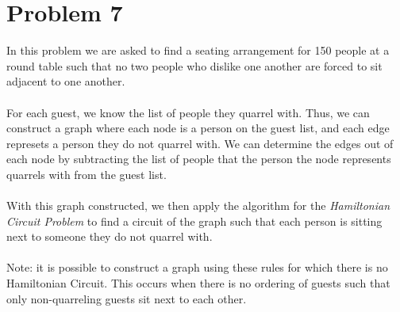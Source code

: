 \section*{Problem 7}

In this problem we are asked to find a seating arrangement for 150 people at a 
round table such that no two people who dislike one another are forced to sit
adjacent to one another.
\\
\\
For each guest, we know the list of people they quarrel with. Thus, we can 
construct a graph where each node is a person on the guest list, and each edge
represets a person they do not quarrel with. We can determine the edges out of
each node by subtracting the list of people that the person the node represents
quarrels with from the guest list.
\\
\\
With this graph constructed, we then apply the algorithm for the 
\textit{Hamiltonian Circuit Problem} to find a circuit of the graph such that
each person is sitting next to someone they do not quarrel with.
\\
\\
Note: it is possible to construct a graph using these rules for which there is
no Hamiltonian Circuit. This occurs when there is no ordering of guests such
that only non-quarreling guests sit next to each other.
